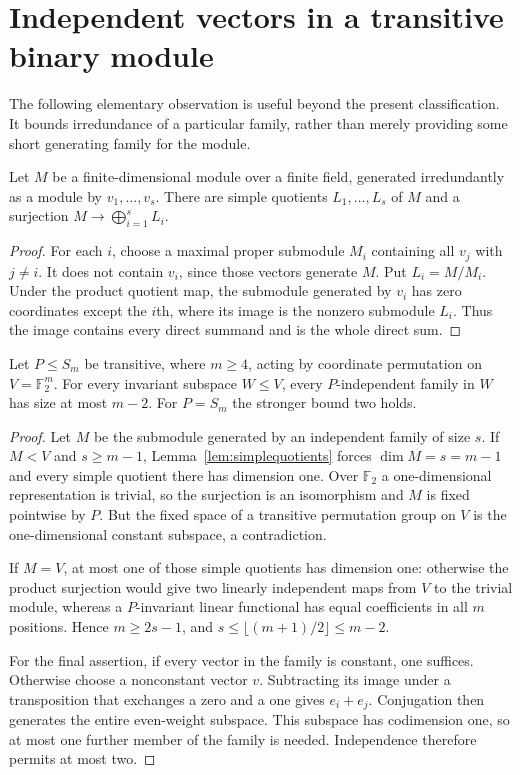 \section{Independent vectors in a transitive binary module}
The following elementary observation is useful beyond the present
classification. It bounds irredundance of a particular family, rather
than merely providing some short generating family for the module.

\begin{lemma}\label{lem:simplequotients}
Let $M$ be a finite-dimensional module over a finite field, generated
irredundantly as a module by $v_1,\ldots,v_s$. There are simple quotients
$L_1,\ldots,L_s$ of $M$ and a surjection
$M\longrightarrow\bigoplus_{i=1}^s L_i$.
\end{lemma}
\begin{proof}
For each $i$, choose a maximal proper submodule $M_i$ containing all
$v_j$ with $j\ne i$. It does not contain $v_i$, since those vectors
generate $M$. Put $L_i=M/M_i$. Under the product quotient map, the
submodule generated by $v_i$ has zero coordinates except the $i$th,
where its image is the nonzero submodule $L_i$. Thus the image contains
every direct summand and is the whole direct sum.
\end{proof}

\begin{lemma}\label{lem:binary}
Let $P\leq S_m$ be transitive, where $m\geq4$, acting by coordinate
permutation on $V=\mathbb F_2^m$. For every invariant subspace
$W\leq V$, every $P$-independent family in $W$ has size at most $m-2$.
For $P=S_m$ the stronger bound two holds.
\end{lemma}
\begin{proof}
Let $M$ be the submodule generated by an independent family of size $s$.
If $M<V$ and $s\geq m-1$, Lemma~\ref{lem:simplequotients} forces
$\dim M=s=m-1$ and every simple quotient there has dimension one.
Over $\mathbb F_2$ a one-dimensional representation is trivial, so the
surjection is an isomorphism and $M$ is fixed pointwise by $P$.
But the fixed space of a transitive permutation group on $V$ is the
one-dimensional constant subspace, a contradiction.

If $M=V$, at most one of those simple quotients has dimension one:
otherwise the product surjection would give two linearly independent
maps from $V$ to the trivial module, whereas a $P$-invariant linear
functional has equal coefficients in all $m$ positions. Hence
$m\geq2s-1$, and $s\leq\lfloor(m+1)/2\rfloor\leq m-2$.

For the final assertion, if every vector in the family is constant,
one suffices. Otherwise choose a nonconstant vector $v$. Subtracting
its image under a transposition that exchanges a zero and a one gives
$e_i+e_j$. Conjugation then generates the entire even-weight subspace.
This subspace has codimension one, so at most one further member of the
family is needed. Independence therefore permits at most two.
\end{proof}

